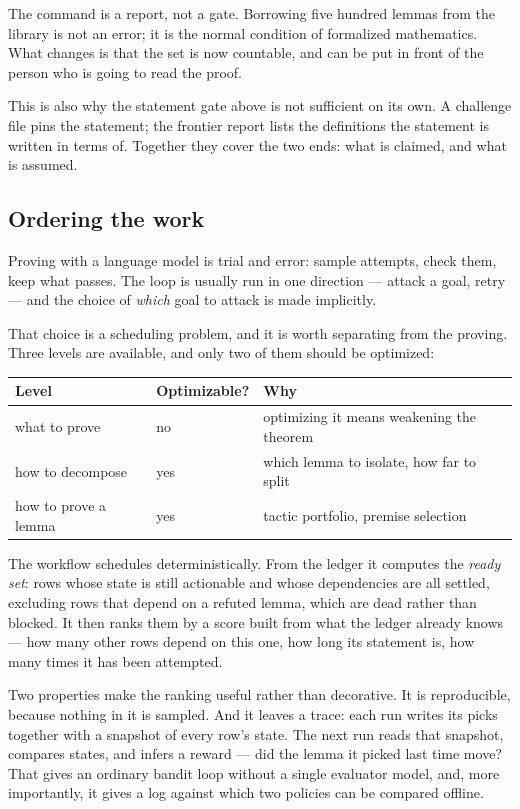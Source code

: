 \documentclass[11pt]{article}
\begin{document}
The command is a report, not a gate. Borrowing five hundred lemmas from the
library is not an error; it is the normal condition of formalized mathematics.
What changes is that the set is now countable, and can be put in front of the
person who is going to read the proof.

This is also why the statement gate above is not sufficient on its own. A
challenge file pins the statement; the frontier report lists the definitions
the statement is written in terms of. Together they cover the two ends: what
is claimed, and what is assumed.

\subsection{Ordering the work}
\label{sec:search}

Proving with a language model is trial and error: sample attempts, check them,
keep what passes. The loop is usually run in one direction --- attack a goal,
retry --- and the choice of \emph{which} goal to attack is made implicitly.

That choice is a scheduling problem, and it is worth separating from the
proving. Three levels are available, and only two of them should be optimized:

\begin{center}
\begin{tabular}{@{}lll@{}}
\toprule
Level & Optimizable? & Why \\
\midrule
what to prove & no & optimizing it means weakening the theorem \\
how to decompose & yes & which lemma to isolate, how far to split \\
how to prove a lemma & yes & tactic portfolio, premise selection \\
\bottomrule
\end{tabular}
\end{center}

The workflow schedules deterministically. From the ledger it computes the
\emph{ready set}: rows whose state is still actionable and whose dependencies
are all settled, excluding rows that depend on a refuted lemma, which are dead
rather than blocked. It then ranks them by a score built from what the ledger
already knows --- how many other rows depend on this one, how long its
statement is, how many times it has been attempted.

Two properties make the ranking useful rather than decorative. It is
reproducible, because nothing in it is sampled. And it leaves a trace: each
run writes its picks together with a snapshot of every row's state. The next
run reads that snapshot, compares states, and infers a reward --- did the
lemma it picked last time move? That gives an ordinary bandit loop without a
single evaluator model, and, more importantly, it gives a log against which
two policies can be compared offline.
\end{document}
